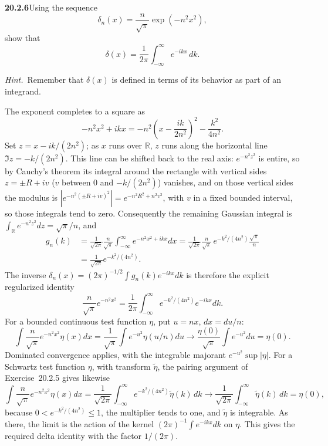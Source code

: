 \par\bigskip
\noindent\textbf{20.2.6}\quad Using the sequence
\[
\delta_{n}(x)=\frac{n}{\sqrt{\pi}}\exp(-n^{2}x^{2}),
\]
show that
\[
\delta(x)=\frac{1}{2\pi}\int_{-\infty}^{\infty}e^{-ikx}\,dk.
\]
\par\emph{Hint.}~Remember that $\delta(x)$ is defined in terms of
its behavior as part of an integrand.
\par{}
\solution
The exponent completes to a square as
\[
-n^2x^2+ikx=-n^2\left(x-\frac{ik}{2n^2}\right)^2
-\frac{k^2}{4n^2}.
\]
Set $z=x-ik/(2n^2)$; as $x$ runs over $\mathbb R$, $z$ runs
along the horizontal line $\Im z=-k/(2n^2)$. This line can be
shifted back to the real axis: $e^{-n^2z^2}$ is entire, so by
Cauchy's theorem its integral around the rectangle with vertical
sides $z=\pm R+iv$ ($v$ between $0$ and $-k/(2n^2)$) vanishes, and
on those vertical sides the modulus is
$|e^{-n^2(\pm R+iv)^2}|=e^{-n^2R^2+n^2v^2}$, with $v$
in a fixed bounded interval, so those integrals tend to zero.
Consequently the remaining Gaussian integral is
$\int_{\mathbb R}e^{-n^2z^2}dz=\sqrt\pi/n$, and
\begin{align*}
g_n(k)&=\frac1{\sqrt{2\pi}}\frac n{\sqrt\pi}
\int_{-\infty}^{\infty}e^{-n^2x^2+ikx}dx
=\frac1{\sqrt{2\pi}}\frac n{\sqrt\pi}\,e^{-k^2/(4n^2)}
\frac{\sqrt\pi}n\\
&=\frac1{\sqrt{2\pi}}e^{-k^2/(4n^2)}.
\end{align*}
The inverse
$\delta_n(x)=(2\pi)^{-1/2}\int g_n(k)e^{-ikx}dk$ is therefore the
explicit regularized identity
\[
\frac n{\sqrt\pi}e^{-n^2x^2}
=\frac1{2\pi}\int_{-\infty}^{\infty}
e^{-k^2/(4n^2)}e^{-ikx}dk.
\]
For a bounded continuous test function $\eta$, put $u=nx$,
$dx=du/n$:
\[
\int\frac n{\sqrt\pi}e^{-n^2x^2}\eta(x)dx
=\frac1{\sqrt\pi}\int e^{-u^2}\eta(u/n)du
\longrightarrow\frac{\eta(0)}{\sqrt\pi}\int e^{-u^2}du=\eta(0).
\]
Dominated convergence applies, with the integrable majorant
$e^{-u^2}\sup|\eta|$. For a Schwartz test function $\eta$, with
transform $\tilde\eta$, the pairing argument of Exercise~20.2.5
gives likewise
\[
\int\frac n{\sqrt\pi}e^{-n^2x^2}\eta(x)dx
=\frac1{\sqrt{2\pi}}\int_{-\infty}^{\infty}
e^{-k^2/(4n^2)}\tilde\eta(k)\,dk
\longrightarrow\frac1{\sqrt{2\pi}}\int_{-\infty}^{\infty}
\tilde\eta(k)\,dk=\eta(0),
\]
because $0<e^{-k^2/(4n^2)}\le1$, the multiplier tends to one, and
$\tilde\eta$ is integrable. As there, the limit is the action of
the kernel $(2\pi)^{-1}\int e^{-ikx}dk$ on $\eta$. This gives the
required delta identity with the factor $1/(2\pi)$.

